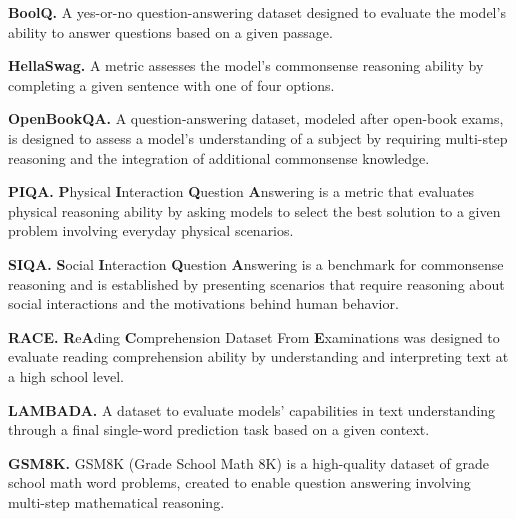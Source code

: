 \documentclass{article} %
\begin{document}
\textbf{BoolQ.} A yes-or-no question-answering dataset designed to evaluate the model's ability to answer questions based on a given passage.

\textbf{HellaSwag.} A metric assesses the model's commonsense reasoning ability by completing a given sentence with one of four options.

\textbf{OpenBookQA.} A question-answering dataset, modeled after open-book exams, is designed to assess a model's understanding of a subject by requiring multi-step reasoning and the integration of additional commonsense knowledge.

\textbf{PIQA.} \textbf{P}hysical \textbf{I}nteraction \textbf{Q}uestion \textbf{A}nswering is a metric that evaluates physical reasoning ability by asking models to select the best solution to a given problem involving everyday physical scenarios.

\textbf{SIQA.} \textbf{S}ocial \textbf{I}nteraction \textbf{Q}uestion \textbf{A}nswering is a benchmark for commonsense reasoning and is established by presenting scenarios that require reasoning about social interactions and the motivations behind human behavior.

\textbf{RACE.} \textbf{R}e\textbf{A}ding \textbf{C}omprehension Dataset From \textbf{E}xaminations was designed to evaluate reading comprehension ability by understanding and interpreting text at a high school level.

\textbf{LAMBADA.} A dataset to evaluate models' capabilities in text understanding through a final single-word prediction task based on a given context.

\textbf{GSM8K.} GSM8K (Grade School Math 8K) is a high-quality dataset of grade school math word problems, created to enable question answering involving multi-step mathematical reasoning.
\end{document}
